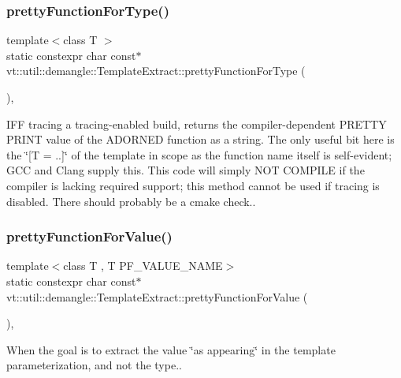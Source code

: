 \subsubsection{\texorpdfstring{pretty\+Function\+For\+Type()}{prettyFunctionForType()}}
{\footnotesize\ttfamily template$<$class T $>$ \\
static constexpr char const$\ast$ vt\+::util\+::demangle\+::\+Template\+Extract\+::pretty\+Function\+For\+Type (\begin{DoxyParamCaption}{ }\end{DoxyParamCaption})\hspace{0.3cm}{\ttfamily [inline]}, {\ttfamily [static]}}

I\+FF tracing a tracing-\/enabled build, returns the compiler-\/dependent \textquotesingle{}P\+R\+E\+T\+TY P\+R\+I\+NT\textquotesingle{} value of the A\+D\+O\+R\+N\+ED function as a string. The only useful bit here is the \char`\"{}\mbox{[}\+T = ..\mbox{]}\char`\"{} of the template in scope as the function name itself is self-\/evident; G\+CC and Clang supply this. This code will simply N\+OT C\+O\+M\+P\+I\+LE if the compiler is lacking required support; this method cannot be used if tracing is disabled. There should probably be a cmake check.. \mbox{\label{structvt_1_1util_1_1demangle_1_1_template_extract_a2fa8ebf7aca434dc7bf6c3113b04226b}} 
\subsubsection{\texorpdfstring{pretty\+Function\+For\+Value()}{prettyFunctionForValue()}}
{\footnotesize\ttfamily template$<$class T , T P\+F\+\_\+\+V\+A\+L\+U\+E\+\_\+\+N\+A\+ME$>$ \\
static constexpr char const$\ast$ vt\+::util\+::demangle\+::\+Template\+Extract\+::pretty\+Function\+For\+Value (\begin{DoxyParamCaption}{ }\end{DoxyParamCaption})\hspace{0.3cm}{\ttfamily [inline]}, {\ttfamily [static]}}

When the goal is to extract the value \char`\"{}as appearing\char`\"{} in the template parameterization, and not the type.. \mbox{\label{structvt_1_1util_1_1demangle_1_1_template_extract_a1fc274aa3088c6c65c5da2450896d6bf}} 
